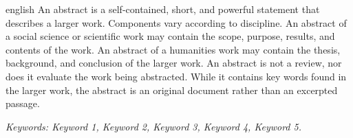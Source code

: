 \documentclass[
	12pt,				%
	twoside,			%
	a4paper,			%
	chapter=TITLE,		%
	section=TITLE,		%
	subsection=TITLE,	%
	subsubsection=TITLE,%
	english,			%
	french,				%
	spanish,			%
	brazil,				%
	]{abntex2}
\begin{document}
\begin{resumo}[Abstract]
    \begin{otherlanguage*}{english}
        An abstract is a self-contained, short, and powerful statement that describes a larger work. Components vary according to discipline. An abstract of a social science or scientific work may contain the scope, purpose, results, and contents of the work. An abstract of a humanities work may contain the thesis, background, and conclusion of the larger work. An abstract is not a review, nor does it evaluate the work being abstracted. While it contains key words found in the larger work, the abstract is an original document rather than an excerpted passage.

        \textit{Keywords: Keyword 1, Keyword 2, Keyword 3, Keyword 4, Keyword 5.}
    \end{otherlanguage*}
\end{resumo}

\listoffigures*
\cleardoublepage


\cleardoublepage

\tableofcontents*
\cleardoublepage


\textual












\postextual


\end{document}
